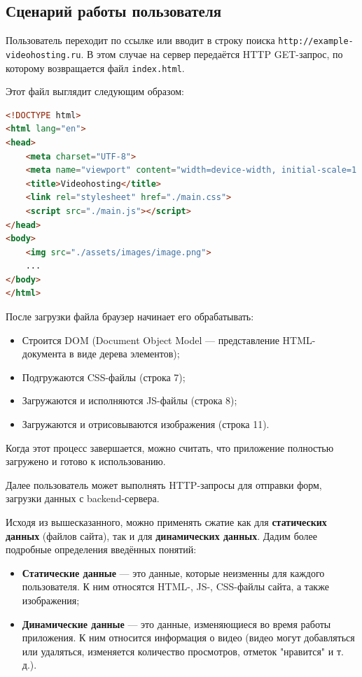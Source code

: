 \documentclass[12pt]{article}
\begin{document}
\subsection{Сценарий работы пользователя}

Пользователь переходит по ссылке или вводит в строку поиска \texttt{http://example-videohosting.ru}.  
В этом случае на сервер передаётся HTTP GET-запрос, по которому возвращается файл \verb|index.html|.

Этот файл выглядит следующим образом:

\begin{lstlisting}[language=HTML]
<!DOCTYPE html>
<html lang="en">
<head>
    <meta charset="UTF-8">
    <meta name="viewport" content="width=device-width, initial-scale=1.0">
    <title>Videohosting</title>
    <link rel="stylesheet" href="./main.css">
    <script src="./main.js"></script>
</head>
<body>
    <img src="./assets/images/image.png">
    ...
</body>
</html>
\end{lstlisting}

После загрузки файла браузер начинает его обрабатывать:

\begin{itemize}
    \item Строится DOM (Document Object Model — представление HTML-документа в виде дерева элементов);
    \item Подгружаются CSS-файлы (строка 7);
    \item Загружаются и исполняются JS-файлы (строка 8);
    \item Загружаются и отрисовываются изображения (строка 11).
\end{itemize}

Когда этот процесс завершается, можно считать, что приложение полностью загружено и готово к использованию.

Далее пользователь может выполнять HTTP-запросы для отправки форм, загрузки данных с backend-сервера.

Исходя из вышесказанного, можно применять сжатие как для \textbf{статических данных} (файлов сайта), так и для \textbf{динамических данных}.  
Дадим более подробные определения введённых понятий:

\begin{itemize}
    \item \textbf{Статические данные} — это данные, которые неизменны для каждого пользователя.  
    К ним относятся HTML-, JS-, CSS-файлы сайта, а также изображения;
    
    \item \textbf{Динамические данные} — это данные, изменяющиеся во время работы приложения.  
    К ним относится информация о видео (видео могут добавляться или удаляться, изменяется количество просмотров, отметок "нравится" и т. д.).
\end{itemize}
\end{document}
